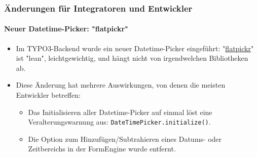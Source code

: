 %

\begin{frame}[fragile]
	\frametitle{Änderungen für Integratoren und Entwickler}
	\framesubtitle{Neuer Datetime-Picker: "flatpickr"}

	\lstset{basicstyle=\tiny\ttfamily}

	\begin{itemize}
		\item Im TYPO3-Backend wurde ein neuer Datetime-Picker eingeführt:\newline
			"\href{https://flatpickr.js.org/}{flatpickr}"
			ist "lean", leichtgewichtig, und hängt nicht von irgendwelchen Bibliotheken ab.
		\item Diese Änderung hat mehrere Auswirkungen, von denen die meisten Entwickler betreffen:

			\begin{itemize}\small
				\item Das Initialisieren aller Datetime-Picker auf einmal löst eine Veralterungswarnung aus:\newline
					\texttt{DateTimePicker.initialize()}.
				\item Die Option zum Hinzufügen/Subtrahieren eines Datums- oder Zeitbereichs in der FormEngine wurde entfernt.
			\end{itemize}

	\end{itemize}

\end{frame}

